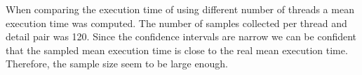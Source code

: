 When comparing the execution time of using different number of threads a mean execution time was computed. The number of samples collected per thread and detail pair was 120. Since the confidence intervals are narrow we can be confident that the sampled mean execution time is close to the real mean execution time. Therefore, the sample size seem to be large enough. 
  
